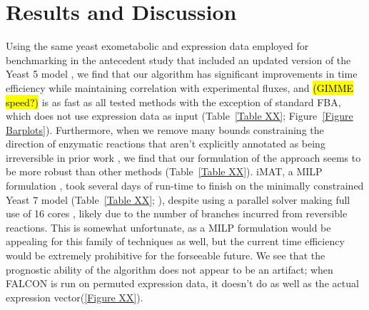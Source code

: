 




\section{Results and Discussion}

Using the same yeast exometabolic and expression data employed for
benchmarking in the antecedent study \citep{Lee2012} that included an
updated version of the Yeast 5 model \citep{Heavner2012}, we find that
our algorithm has significant improvements in time efficiency while
maintaining correlation with experimental fluxes, and \hl{(GIMME
  speed?)} is as fast as all tested methods with the exception of
standard FBA, which does not use expression data as input (Table~\ref{Table
  XX}; Figure~\ref{Figure Barplots}). Furthermore, when we remove many bounds
constraining the direction of enzymatic reactions that aren't
explicitly annotated as being irreversible in prior work
\citep{Lee2012}, we find that our formulation of the approach seems to
be more robust than other methods (Table~\ref{Table XX}). iMAT, a MILP
formulation \citep{Shlomi2008}, took several days of run-time to
finish on the minimally constrained Yeast 7 model (Table~\ref{Table
  XX}; \citealt{Aung2013}), despite using a parallel solver making
full use of 16 cores \citep{gurobi},
likely due to the number of branches incurred from reversible
reactions. This is somewhat unfortunate, as a MILP formulation would
be appealing for this family of techniques as well, but the current
time efficiency would be extremely prohibitive for the forseeable
future. We see that the prognostic ability of the algorithm does not
appear to be an artifact; when FALCON is run on permuted expression data,
it doesn't do as well as the actual expression vector(\ref{Figure
  XX}).

